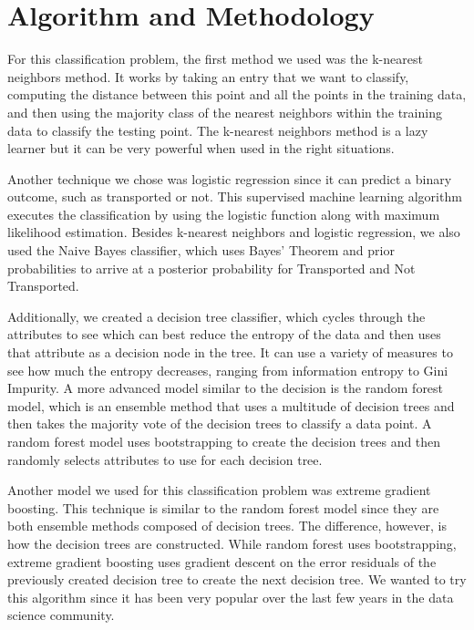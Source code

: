 \documentclass[fleqn,10pt]{SelfArx} %
\begin{document}
\bigskip
\bigskip



\section{Algorithm and Methodology}

For this classification problem, the first method we used was the k-nearest neighbors method. It works by taking an entry that we want to classify, computing the distance between this point and all the points in the training data, and then using the majority class of the nearest neighbors within the training data to classify the testing point. The k-nearest neighbors method is a lazy learner but it can be very powerful when used in the right situations. 

Another technique we chose was logistic regression since it can predict a binary outcome, such as transported or not. This supervised machine learning algorithm executes the classification by using the logistic function along with maximum likelihood estimation. Besides k-nearest neighbors and logistic regression, we also used the Naive Bayes classifier, which uses Bayes’ Theorem and prior probabilities to arrive at a posterior probability for Transported and Not Transported. 

Additionally, we created a decision tree classifier, which cycles through the attributes to see which can best reduce the entropy of the data and then uses that attribute as a decision node in the tree. It can use a variety of measures to see how much the entropy decreases, ranging from information entropy to Gini Impurity. A more advanced model similar to the decision is the random forest model, which is an ensemble method that uses a multitude of decision trees and then takes the majority vote of the decision trees to classify a data point. A random forest model uses bootstrapping to create the decision trees and then randomly selects attributes to use for each decision tree. 

Another model we used for this classification problem was extreme gradient boosting. This technique is similar to the random forest model since they are both ensemble methods composed of decision trees. The difference, however, is how the decision trees are constructed. While random forest uses bootstrapping, extreme gradient boosting uses gradient descent on the error residuals of the previously created decision tree to create the next decision tree. We wanted to try this algorithm since it has been very popular over the last few years in the data science community. 
\end{document}
